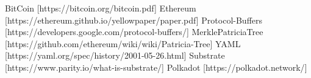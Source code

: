 
\begin{thebibliography}{9}
 BitCoin {[}https://bitcoin.org/bitcoin.pdf{]}
  Ethereum {[}https://ethereum.github.io/yellowpaper/paper.pdf{]}
  Protocol-Buffers {[}https://developers.google.com/protocol-buffers/{]}
 MerklePatriciaTree
{[}https://github.com/ethereum/wiki/wiki/Patricia-Tree{]}
  YAML {[}https://yaml.org/spec/history/2001-05-26.html{]}
  Substrate {[}https://www.parity.io/what-is-substrate/{]}
  Polkadot {[}https://polkadot.network/{]}
\end{thebibliography}
